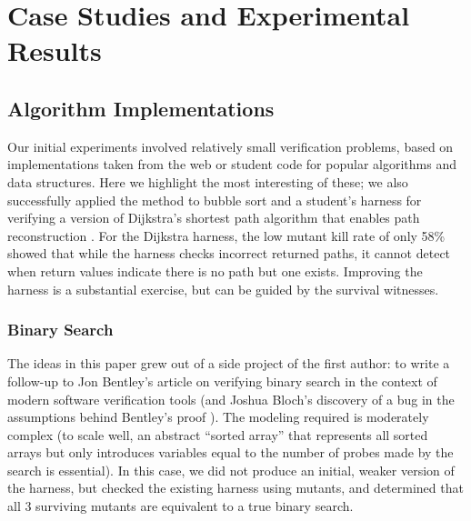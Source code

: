 \documentclass{svjour3}
\begin{document}
\section{Case Studies and Experimental Results}

\subsection{Algorithm Implementations}

Our initial experiments involved relatively small verification
problems, based on implementations taken from the web or student code for popular
algorithms and data structures.  Here we highlight the most
interesting of these; we also successfully applied the method to
bubble sort and a student's harness for verifying a version of Dijkstra's
shortest path algorithm that enables path reconstruction \cite{dijkstrasp}.  For the Dijkstra
harness, the low mutant kill rate of only 58\% showed that while the
harness checks incorrect returned paths, it cannot detect when return
values indicate there is no path but one exists.  Improving the
harness is a substantial exercise, but can be guided by the survival witnesses.

\subsubsection{Binary Search}

The ideas in this paper grew out of a side project of the first
author: to write a follow-up to Jon Bentley's article on verifying
binary search \cite{Bentley} in the context of modern software
verification tools (and Joshua Bloch's discovery of a bug in the
assumptions behind Bentley's proof \cite{Bloch}).  The modeling
required is moderately complex (to scale well, an abstract ``sorted
array'' that represents all sorted arrays but only introduces
variables equal to the number of probes made by the search is
essential).  In this case, we did not produce an initial, weaker
version of the harness, but checked the existing harness using
mutants, and determined that all 3 surviving mutants are equivalent to
a true binary search.
\end{document}
